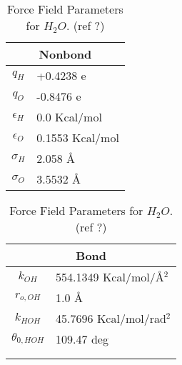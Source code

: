 \documentclass[twoside,english]{uiofysmaster}
\begin{document}
\begin{table}
 \caption{Force Field Parameters for $H_2O$. (ref ?) }
  \begin{tabular}[]{|c|l|}
  \hline
  \multicolumn{2}{|c|}{Nonbond} \\ \hline
  $q_H$ & +0.4238 e  \\ \hline
  $q_O$ & -0.8476 e  \\ \hline
  $\epsilon _H$ & 0.0 Kcal/mol \\ \hline
  $\epsilon _O$ & 0.1553 Kcal/mol \\ \hline
  $\sigma _H$ & 2.058 \AA{} \\ \hline
  $\sigma _O$ & 3.5532 \AA{} \\ \hline
 \end{tabular}
  \begin{tabular}[]{|c|l|}
  \hline
  \multicolumn{2}{|c|}{Bond} \\ \hline
  $k_{OH}$ & 554.1349 Kcal/mol/\AA{}$^2$  \\ \hline
  $r_{o,OH}$ & 1.0 \AA{}  \\ \hline
  $k_{HOH}$ & 45.7696 Kcal/mol/rad$^2$ \\ \hline
  $\theta _{0,HOH}$ & 109.47 deg \\ \hline
                    &           \\ \hline
                    &           \\ \hline

 \end{tabular}
 \label{ForceFieldParameters_H2O}
\end{table}
\end{document}
